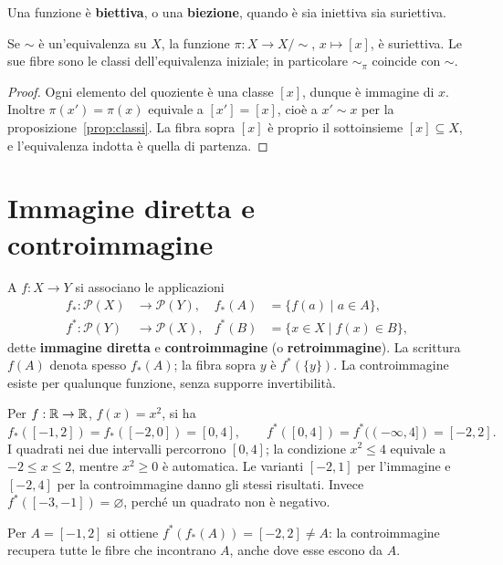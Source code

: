 \begin{definizione}
Una funzione è \textbf{biettiva}, o una \textbf{biezione}, quando è sia iniettiva sia suriettiva.
\end{definizione}

\begin{proposizione}
Se $\sim$ è un'equivalenza su $X$, la funzione $\pi:X\to X/{\sim}$, $x\mapsto[x]$, è suriettiva. Le sue fibre sono le classi dell'equivalenza iniziale; in particolare $\sim_\pi$ coincide con $\sim$.
\end{proposizione}
\begin{proof}
Ogni elemento del quoziente è una classe $[x]$, dunque è immagine di $x$. Inoltre $\pi(x')=\pi(x)$ equivale a $[x']=[x]$, cioè a $x'\sim x$ per la proposizione~\ref{prop:classi}. La fibra sopra $[x]$ è proprio il sottoinsieme $[x]\subseteq X$, e l'equivalenza indotta è quella di partenza.
\end{proof}

\section{Immagine diretta e controimmagine}
\begin{definizione}
A $f:X\to Y$ si associano le applicazioni
\[
\begin{aligned}
f_*:\mathcal P(X)&\to\mathcal P(Y),& f_*(A)&=\{f(a)\mid a\in A\},\\
f^*:\mathcal P(Y)&\to\mathcal P(X),& f^*(B)&=\{x\in X\mid f(x)\in B\},
\end{aligned}
\]
dette \textbf{immagine diretta} e \textbf{controimmagine} (o \textbf{retroimmagine}). La scrittura $f(A)$ denota spesso $f_*(A)$; la fibra sopra $y$ è $f^*(\{y\})$. La controimmagine esiste per qualunque funzione, senza supporre invertibilità.
\end{definizione}

\begin{esempio}[Il quadrato]
Per $f:\mathbb{R}\to\mathbb{R}$, $f(x)=x^2$, si ha
\[
f_*([-1,2])=f_*([-2,0])=[0,4],\qquad
f^*([0,4])=f^*((-\infty,4])=[-2,2].
\]
I quadrati nei due intervalli percorrono $[0,4]$; la condizione $x^2\le4$ equivale a $-2\le x\le2$, mentre $x^2\ge0$ è automatica. Le varianti $[-2,1]$ per l'immagine e $[-2,4]$ per la controimmagine danno gli stessi risultati. Invece $f^*([-3,-1])=\varnothing$, perché un quadrato non è negativo.

Per $A=[-1,2]$ si ottiene $f^*(f_*(A))=[-2,2]\ne A$: la controimmagine recupera tutte le fibre che incontrano $A$, anche dove esse escono da $A$.
\end{esempio}

